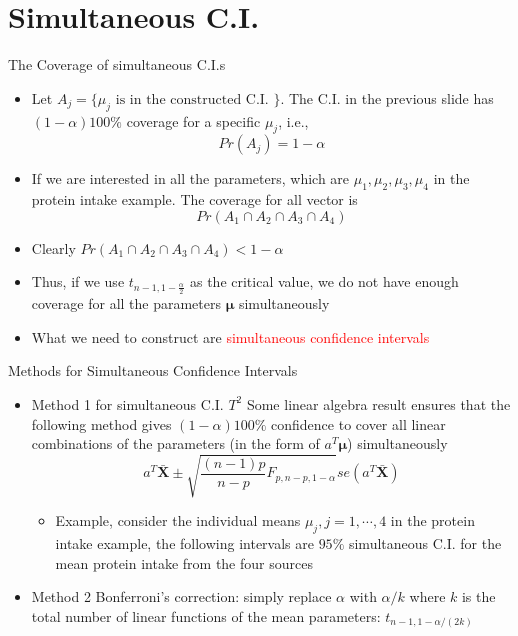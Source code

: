 \documentclass[
  ignorenonframetext,
]{beamer}
\providecommand{\tightlist}{%
  \setlength{\itemsep}{0pt}\setlength{\parskip}{0pt}}
\begin{document}
\hypertarget{simultaneous-c.i.}{%
\section{Simultaneous C.I.}\label{simultaneous-c.i.}}

\begin{frame}{The Coverage of simultaneous C.I.s}
\protect\hypertarget{the-coverage-of-simultaneous-c.i.s}{}
\begin{itemize}
\item
  Let \(A_j=\{\mu_j\mbox{ is in the constructed C.I. }\}\). The C.I. in
  the previous slide has \((1-\alpha)100\%\) coverage for a specific
  \(\mu_j\), i.e., \[Pr(A_j)=1-\alpha\]
\item
  If we are interested in all the parameters, which are
  \(\mu_1, \mu_2, \mu_3, \mu_4\) in the protein intake example. The
  coverage for all vector is \[Pr(A_1\cap A_2 \cap A_3 \cap A_4)\]
\item
  Clearly \(Pr(A_1\cap A_2 \cap A_3 \cap A_4)<1-\alpha\)
\item
  Thus, if we use \(t_{n-1, 1-\frac{\alpha}{2}}\) as the critical value,
  we do not have enough coverage for all the parameters
  \(\boldsymbol \mu\) simultaneously
\item
  What we need to construct are
  \textcolor{red}{simultaneous confidence intervals}
\end{itemize}
\end{frame}

\begin{frame}{Methods for Simultaneous Confidence Intervals}
\protect\hypertarget{methods-for-simultaneous-confidence-intervals}{}
\begin{itemize}
\item
  Method 1 for simultaneous C.I. \(T^2\) Some linear algebra result
  ensures that the following method gives \((1-\alpha)100\%\) confidence
  to cover all linear combinations of the parameters (in the form of
  \(a^T\boldsymbol \mu\)) simultaneously
  \[a^T\bar{\mathbf X}\pm \sqrt{\frac{(n-1)p}{n-p}F_{p, n-p, 1-\alpha}} se(a^T\bar{\mathbf X}) \]

  \begin{itemize}
  \tightlist
  \item
    Example, consider the individual means \(\mu_j, j=1,\cdots, 4\) in
    the protein intake example, the following intervals are \(95\%\)
    simultaneous C.I. for the mean protein intake from the four sources
  \end{itemize}
\item
  Method 2 Bonferroni's correction: simply replace \(\alpha\) with
  \(\alpha/k\) where \(k\) is the total number of linear functions of
  the mean parameters: \(t_{n-1, 1-\alpha/(2k)}\)
\end{itemize}
\end{frame}
\end{document}
